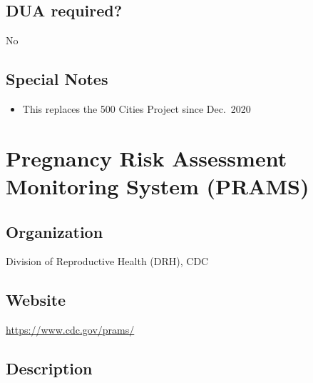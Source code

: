 \documentclass[
]{book}
\providecommand{\tightlist}{%
  \setlength{\itemsep}{0pt}\setlength{\parskip}{0pt}}
\begin{document}
\hypertarget{dua-required-73}{%
\section{DUA required?}\label{dua-required-73}}

No

\hypertarget{special-notes-73}{%
\section{Special Notes}\label{special-notes-73}}

\begin{itemize}
\tightlist
\item
  This replaces the 500 Cities Project since Dec.~2020
\end{itemize}

\mainmatter

\hypertarget{pregnancy-risk-assessment-monitoring-system-prams}{%
\chapter{Pregnancy Risk Assessment Monitoring System (PRAMS)}\label{pregnancy-risk-assessment-monitoring-system-prams}}

\hypertarget{organization-74}{%
\section{Organization}\label{organization-74}}

Division of Reproductive Health (DRH), CDC

\hypertarget{website-74}{%
\section{Website}\label{website-74}}

\url{https://www.cdc.gov/prams/}

\hypertarget{description-74}{%
\section{Description}\label{description-74}}
\end{document}
